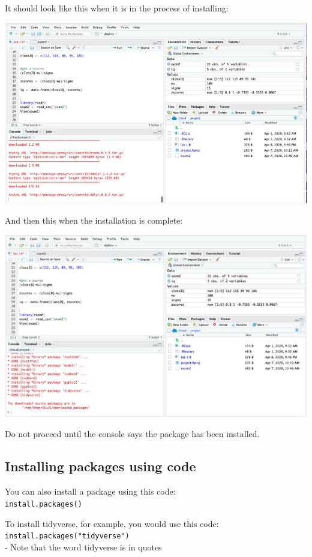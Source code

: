 \documentclass[
]{book}
\begin{document}
It should look like this when it is in the process of installing:

\includegraphics{img/instload2.png}

And then this when the installation is complete:

\includegraphics{img/instload3.png}

Do not proceed until the console says the package has been installed.

\hypertarget{installing-packages-using-code}{%
\subsection{Installing packages using code}\label{installing-packages-using-code}}

You can also install a package using this code:\\
\texttt{install.packages()}

To install tidyverse, for example, you would use this code:\\
\texttt{install.packages("tidyverse")}~\\
- Note that the word tidyverse is in quotes
\end{document}
